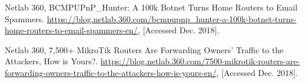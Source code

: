 \documentclass[conference]{IEEEtran}
\begin{document}
\begin{thebibliography}{99}
Netlab 360, BCMPUPnP\_Hunter: A 100k Botnet Turns Home Routers to Email Spammers. \url{https://blog.netlab.360.com/bcmpupnp_hunter-a-100k-botnet-turns-home-routers-to-email-spammers-en/}, [Accessed Dec. 2018].

Netlab 360, 7,500+ MikroTik Routers Are Forwarding Owners' Traffic to the Attackers, How is Yours?. \url{https://blog.netlab.360.com/7500-mikrotik-routers-are-forwarding-owners-traffic-to-the-attackers-how-is-yours-en/}, [Accessed Dec. 2018].


\end{thebibliography}
\end{document}
